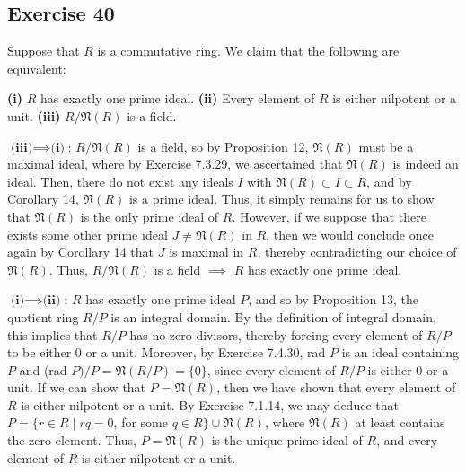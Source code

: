\subsection*{Exercise 40}
Suppose that $R$ is a commutative ring. We claim that the following are equivalent:

\textbf{(i)} $R$ has exactly one prime ideal.
\newline
\textbf{(ii)} Every element of $R$ is either nilpotent or a unit.
\newline
\textbf{(iii)} $R/\mathfrak{N}(R)$ is a field.

\vspace{3 mm}

$\textbf{(iii)} \implies \textbf{(i)}$:
\newline
$R/\mathfrak{N}(R)$ is a field, so by Proposition 12, $\mathfrak{N}(R)$ must be a maximal ideal, where by Exercise 7.3.29, we ascertained that $\mathfrak{N}(R)$ is indeed an ideal. Then, there do not exist any ideals $I$ with $\mathfrak{N}(R) \subset I \subset R$, and by Corollary 14, $\mathfrak{N}(R)$ is a prime ideal. Thus, it simply remains for us to show that $\mathfrak{N}(R)$ is the only prime ideal of $R$. However, if we suppose that there exists some other prime ideal $J \not= \mathfrak{N}(R)$ in $R$, then we would conclude once again by Corollary 14 that $J$ is maximal in $R$, thereby contradicting our choice of $\mathfrak{N}(R)$. Thus, $R/\mathfrak{N}(R)$ is a field $\implies$ $R$ has exactly one prime ideal.

\vspace{3 mm}

$\textbf{(i)} \implies \textbf{(ii)}$:
\newline
$R$ has exactly one prime ideal $P$, and so by Proposition 13, the quotient ring $R/P$ is an integral domain. By the definition of integral domain, this implies that $R/P$ has no zero divisors, thereby forcing every element of $R/P$ to be either 0 or a unit. Moreover, by Exercise 7.4.30, rad $P$ is an ideal containing $P$ and (rad $P)/P = \mathfrak{N}(R/P) = \{0\}$, since every element of $R/P$ is either 0 or a unit. If we can show that $P = \mathfrak{N}(R)$, then we have shown that every element of $R$ is either nilpotent or a unit. By Exercise 7.1.14, we may deduce that $P = \{r \in R \mid rq = 0$, for some $q \in R \} \cup \mathfrak{N}(R)$, where $\mathfrak{N}(R)$ at least contains the zero element. Thus, $P = \mathfrak{N}(R)$ is the unique prime ideal of $R$, and every element of $R$ is either nilpotent or a unit.

